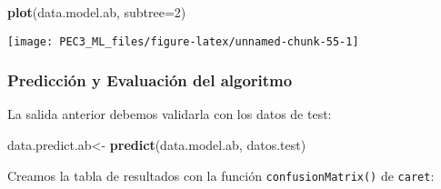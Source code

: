 \documentclass[
]{article}
\newenvironment{Shaded}{\begin{snugshade}}{\end{snugshade}}
\newcommand{\DataTypeTok}[1]{\textcolor[rgb]{0.13,0.29,0.53}{#1}}
\newcommand{\DecValTok}[1]{\textcolor[rgb]{0.00,0.00,0.81}{#1}}
\newcommand{\KeywordTok}[1]{\textcolor[rgb]{0.13,0.29,0.53}{\textbf{#1}}}
\newcommand{\NormalTok}[1]{#1}
\newcommand{\OperatorTok}[1]{\textcolor[rgb]{0.81,0.36,0.00}{\textbf{#1}}}
\newcommand{\StringTok}[1]{\textcolor[rgb]{0.31,0.60,0.02}{#1}}
\begin{document}
\begin{Shaded}
\begin{Highlighting}[]
\KeywordTok{plot}\NormalTok{(data.model.ab, }\DataTypeTok{subtree=}\DecValTok{2}\NormalTok{) }
\end{Highlighting}
\end{Shaded}

\begin{center}\texttt{[image: PEC3\_ML\_files/figure-latex/unnamed-chunk-55-1]} \end{center}

\hypertarget{predicciuxf3n-y-evaluaciuxf3n-del-algoritmo-3}{%
\subsubsection{Predicción y Evaluación del
algoritmo}\label{predicciuxf3n-y-evaluaciuxf3n-del-algoritmo-3}}

La salida anterior debemos validarla con los datos de test:

\begin{Shaded}
\begin{Highlighting}[]
\NormalTok{data.predict.ab<-}\StringTok{ }\KeywordTok{predict}\NormalTok{(data.model.ab, datos.test)}
\end{Highlighting}
\end{Shaded}

Creamos la tabla de resultados con la función \texttt{confusionMatrix()}
de \texttt{caret}:

\begin{Shaded}
\end{Shaded}
\end{document}
